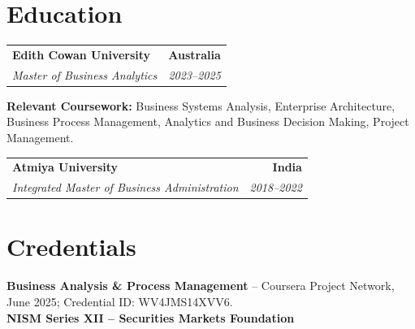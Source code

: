 \documentclass[letterpaper,10pt]{article}
\makeatletter
\newcommand{\role}[4]{%
  \begin{tabularx}{\textwidth}{@{}Xr@{}}
    \textbf{#1} & \textbf{#2} \\
    \textit{#3} & \textit{#4}
  \end{tabularx}\vspace{-1pt}
}
\makeatother
\begin{document}
\section{Education}
\role{Edith Cowan University}{Australia}{Master of Business Analytics}{2023--2025}
\small\textbf{Relevant Coursework:} Business Systems Analysis, Enterprise Architecture, Business Process Management, Analytics and Business Decision Making, Project Management.\\[2pt]
\role{Atmiya University}{India}{Integrated Master of Business Administration}{2018--2022}

\section{Credentials}
\small\textbf{Business Analysis \& Process Management} -- Coursera Project Network, June 2025; Credential ID: WV4JMS14XVV6.\\[-0.2pt]
\small\textbf{NISM Series XII -- Securities Markets Foundation}
\end{document}
